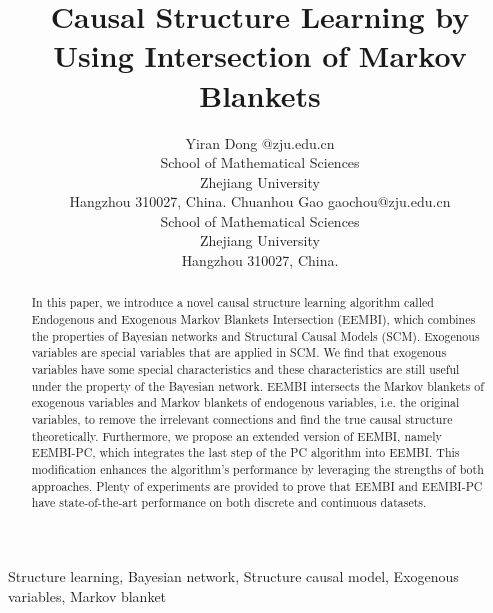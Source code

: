 \documentclass[twoside,11pt]{article}
\begin{document}
\title{Causal Structure Learning by Using Intersection of Markov Blankets}

\author{\name Yiran Dong @zju.edu.cn \\
       \addr School of Mathematical Sciences\\
	   Zhejiang University\\
	   Hangzhou 310027, China.
       \AND
       \name Chuanhou Gao \email gaochou@zju.edu.cn \\
       \addr School of Mathematical Sciences \\
	  Zhejiang University\\
       Hangzhou 310027, China.}


\maketitle

\begin{abstract}%
In this paper, we introduce a novel causal structure learning algorithm called Endogenous and Exogenous Markov Blankets Intersection (EEMBI), which combines the properties of Bayesian networks and Structural Causal Models (SCM). Exogenous variables are special variables that are applied in SCM. We find that exogenous variables have some special characteristics and these characteristics are still useful under the property of the Bayesian network. EEMBI intersects the Markov blankets of exogenous variables and Markov blankets of endogenous variables, i.e. the original variables, to remove the irrelevant connections and find the true causal structure theoretically. Furthermore, we propose an extended version of EEMBI, namely EEMBI-PC, which integrates the last step of the PC algorithm into EEMBI. This modification enhances the algorithm's performance by leveraging the strengths of both approaches. Plenty of experiments are provided to prove that EEMBI and EEMBI-PC have state-of-the-art performance on both discrete and continuous datasets.
\end{abstract}
\begin{keywords}
Structure learning, Bayesian network, Structure causal model, Exogenous variables, Markov blanket
\end{keywords}
\end{document}
